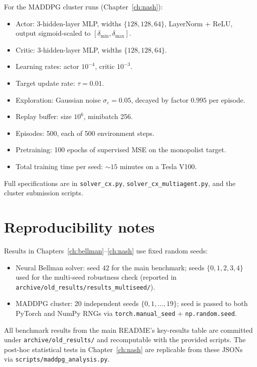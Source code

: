 For the MADDPG cluster runs (Chapter~\ref{ch:nash}):
\begin{itemize}[leftmargin=2em]
  \item Actor: 3-hidden-layer MLP, widths $\{128, 128, 64\}$, LayerNorm + ReLU, output sigmoid-scaled to $[\delta_{\min}, \delta_{\max}]$.
  \item Critic: 3-hidden-layer MLP, widths $\{128, 128, 64\}$.
  \item Learning rates: actor $10^{-4}$, critic $10^{-3}$.
  \item Target update rate: $\tau = 0.01$.
  \item Exploration: Gaussian noise $\sigma_\varepsilon = 0.05$, decayed by factor $0.995$ per episode.
  \item Replay buffer: size $10^6$, minibatch 256.
  \item Episodes: 500, each of 500 environment steps.
  \item Pretraining: 100 epochs of supervised MSE on the monopolist target.
  \item Total training time per seed: $\sim 15$ minutes on a Tesla V100.
\end{itemize}

Full specifications are in \texttt{solver\_cx.py}, \texttt{solver\_cx\_multiagent.py}, and the cluster submission scripts.

\section{Reproducibility notes}

Results in Chapters~\ref{ch:bellman}--\ref{ch:nash} use fixed random seeds:
\begin{itemize}[leftmargin=2em]
  \item Neural Bellman solver: seed $42$ for the main benchmark; seeds $\{0, 1, 2, 3, 4\}$ used for the multi-seed robustness check (reported in \texttt{archive/old\_results/results\_multiseed/}).
  \item MADDPG cluster: 20 independent seeds $\{0, 1, \ldots, 19\}$; seed is passed to both PyTorch and NumPy RNGs via \texttt{torch.manual\_seed} + \texttt{np.random.seed}.
\end{itemize}
All benchmark results from the main README's key-results table are committed under \texttt{archive/old\_results/} and recomputable with the provided scripts. The post-hoc statistical tests in Chapter~\ref{ch:nash} are replicable from these JSONs via \texttt{scripts/maddpg\_analysis.py}.

